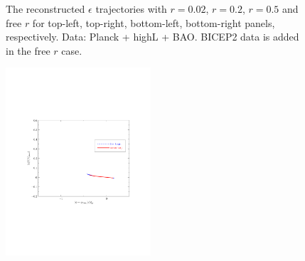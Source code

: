 \documentclass[11pt]{article}
\def \halffigwidth{0.48\textwidth}
\begin{document}
\begin{figure}
  \caption{The reconstructed $\epsilon$ trajectories with $r = 0.02$, $r=0.2$, $r=0.5$ and free $r$ for top-left, top-right, bottom-left, bottom-right panels, respectively. Data: Planck + highL + BAO. BICEP2 data is added in the free $r$ case. \label{fig:traj_eps}}
\end{figure}


\begin{figure}
  \includegraphics[width=\halffigwidth,  trim = 1in 2.9in 1in 2.9in]{nobicep_spline0_p11_r0d02_potential_traj.pdf}%

\end{figure}
\end{document}

